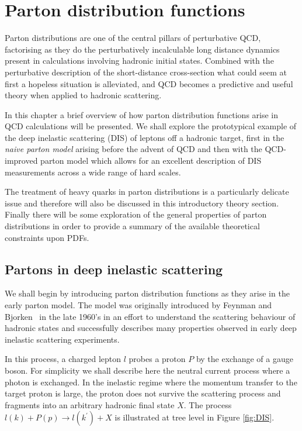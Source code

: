 \chapter{\label{chapter1} Parton distribution functions} 
Parton distributions are one of the central pillars of perturbative QCD, factorising as they do the perturbatively incalculable long distance dynamics present in calculations involving hadronic initial states. Combined with
the perturbative description of the short-distance cross-section what could seem at first a hopeless situation is alleviated, and QCD becomes a predictive and useful theory when applied to hadronic scattering.

In this chapter a brief overview of how parton distribution functions arise in QCD calculations will be presented.
We shall explore the prototypical example of the deep inelastic scattering (DIS) of leptons off a hadronic target, first in the \emph{naive parton model} arising before the advent of QCD and then with the QCD-improved parton model which allows for an excellent description of DIS measurements across a wide range of hard scales.

The treatment of heavy quarks in parton distributions is a particularly delicate issue and therefore will
also be discussed in this introductory theory section. Finally there will be some exploration of the general properties of parton distributions in order to provide a summary of the available theoretical constraints upon PDFs.

\section{Partons in deep inelastic scattering}
We shall begin by introducing parton distribution functions as they arise in the early parton model. The model was originally introduced by Feynman and Bjorken~\cite{feynman1,Feynmanparton,feynmanparton2, Bjorken:1968dy} in the late 1960's in an effort to understand the scattering behaviour of hadronic states and successfully
describes many properties observed in early deep inelastic scattering experiments.

In this process, a charged lepton $l$ probes a proton $P$ by the exchange of a gauge boson. For simplicity we shall describe here the neutral current process where a photon is exchanged. In the inelastic regime where the momentum transfer to the target proton is large, the proton does
not survive the scattering process and fragments into an arbitrary hadronic final state $X$. The process $l(k) + P(p) \to l(k^\prime) + X$ is illustrated at tree level in Figure \ref{fig:DIS}. 

